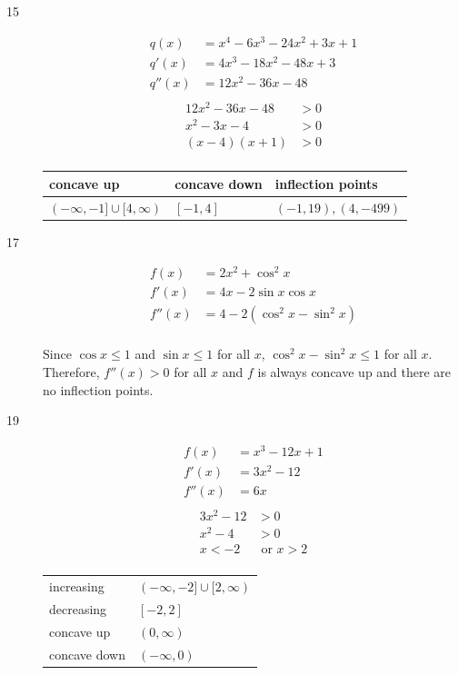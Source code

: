 \documentclass[fleqn]{exam}
\begin{document}
\begin{description}
\item[15]
\begin{align*}
  q(x)   &= x^4 - 6x^3 - 24x^2 + 3x + 1 \\
  q'(x)  &= 4x^3 - 18x^2 - 48x + 3 \\
  q''(x) &= 12x^2 - 36x - 48 \\
\end{align*}
\begin{align*}
  12x^2 - 36x - 48 &> 0 \\
  x^2 - 3x - 4     &> 0 \\
  (x - 4)(x + 1)   &> 0 \\
\end{align*}

\begin{tabular}{lll}
\toprule
concave up                       & concave down & inflection points \\
\midrule
$(-\infty, -1] \cup [4, \infty)$ & $[-1, 4]$    & $(-1, 19), (4, -499)$ \\
\bottomrule
\end{tabular}

\pagebreak

\item[17]
\begin{align*}
  f(x)   &= 2x^2 + \cos^2 x \\
  f'(x)  &= 4x - 2 \sin x \cos x \\
  f''(x) &= 4 - 2(\cos^2 x - \sin^2 x) \\
\end{align*}

Since $\cos x \leq 1$ and $\sin x \leq 1$ for all $x$, $\cos^2 x - \sin^2 x \leq 1$ for all $x$.  Therefore, $f''(x) >
0$ for all $x$ and $f$ is always concave up and there are no inflection points.

\item[19]
\begin{align*}
  f(x)   &= x^3 - 12x + 1 \\
  f'(x)  &= 3x^2 - 12 \\
  f''(x) &= 6x \\
\end{align*}
\begin{align*}
  3x^2 - 12 &> 0 \\
  x^2 - 4 &> 0 \\
  x < -2 & \text{ or } x > 2 \\
\end{align*}

\begin{tabular}{ll}
\toprule
increasing & $(-\infty, -2] \cup [2, \infty)$ \\
decreasing & $[-2, 2]$ \\
\midrule
concave up & $(0, \infty)$ \\
concave down & $(-\infty, 0)$ \\
\bottomrule
\end{tabular}


\end{description}
\end{document}
